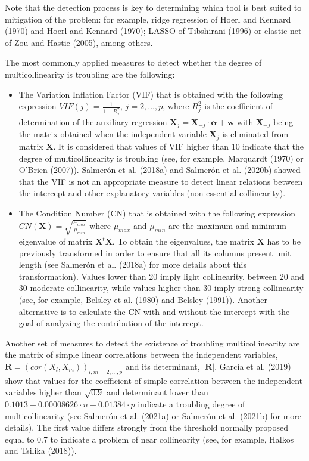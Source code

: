 Note that the detection process is key to determining which tool is best suited to mitigation of the problem: for example, ridge regression of Hoerl and Kennard (1970) and Hoerl and Kennard (1970); LASSO of Tibshirani (1996) or elastic net of Zou and Hastie (2005), among others.

The most commonly applied measures to detect whether the degree of multicollinearity is troubling are the following:

\begin{itemize}
\tightlist
\item
  The Variation Inflation Factor (VIF) that is obtained with the following expression \(VIF(j) = \frac{1}{1-R_{j}^{2}}\), \(j=2,\dots,p\), where \(R_{j}^{2}\) is the coefficient of determination of the auxiliary regression \(\mathbf{X}_{j} = \mathbf{X}_{-j} \cdot \boldsymbol{\alpha} + \mathbf{w}\) with \(\mathbf{X}_{-j}\) being the matrix obtained when the independent variable \(\mathbf{X}_{j}\) is eliminated from matrix \(\mathbf{X}\). It is considered that values of VIF higher than 10 indicate that the degree of multicollinearity is troubling (see, for example, Marquardt (1970) or O'Brien (2007)). Salmerón et al. (2018a) and Salmerón et al. (2020b) showed that the VIF is not an appropriate measure to detect linear relations between the intercept and other explanatory variables (non-essential collinearity).
\item
  The Condition Number (CN) that is obtained with the following expression \(CN(\mathbf{X}) = \sqrt{\frac{\mu_{max}}{\mu_{min}}}\) where \(\mu_{max}\) and \(\mu_{min}\) are the maximum and minimum eigenvalue of matrix \(\mathbf{X}^{t} \mathbf{X}\). To obtain the eigenvalues, the matrix \(\mathbf{X}\) has to be previously transformed in order to ensure that all its columns present unit length (see Salmerón et al. (2018a) for more details about this transformation). Values lower than 20 imply light collinearity, between 20 and 30 moderate collinearity, while values higher than 30 imply strong collinearity (see, for example, Belsley et al. (1980) and Belsley (1991)).
  Another alternative is to calculate the CN with and without the intercept with the goal of analyzing the contribution of the intercept.
\end{itemize}

Another set of measures to detect the existence of troubling multicollinearity are the matrix of simple linear correlations between the independent variables, \(\mathbf{R} = \left( cor(X_{l}, X_{m}) \right)_{l,m=2,\dots,p}\) and its determinant, \(| \mathbf{R} |\).
García et al. (2019) show that values for the coefficient of simple correlation between the independent variables higher than \(\sqrt{0.9}\) and determinant lower than \(0.1013 + 0.00008626 \cdot n - 0.01384 \cdot p\) indicate a troubling degree of multicollinearity (see Salmerón et al. (2021a) or Salmerón et al. (2021b) for more details).
The first value differs strongly from the threshold normally proposed equal to 0.7 to indicate a problem of near collinearity (see, for example, Halkos and Tsilika (2018)).


